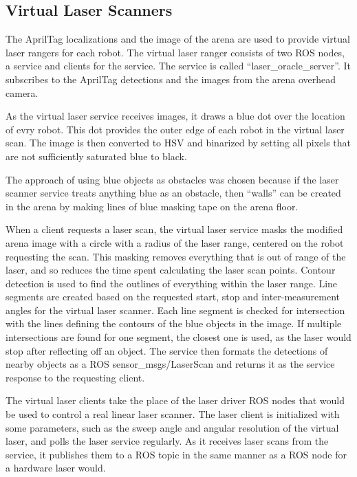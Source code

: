 \documentclass[]{article}
\begin{document}
\subsection{Virtual Laser Scanners}

The AprilTag localizations and the image of the arena are used to provide virtual laser rangers for each robot. 
The virtual laser ranger consists of two ROS nodes, a service and clients for the service. 
The service is called ``laser\_oracle\_server''. 
It subscribes to the AprilTag detections and the images from the arena overhead camera. 

As the virtual laser service receives images, it draws a blue dot over the location of evry robot. 
This dot provides the outer edge of each robot in the virtual laser scan. 
The image is then converted to HSV and binarized by setting all pixels that are not sufficiently saturated blue to black. 

The approach of using blue objects as obstacles was chosen because if the laser scanner service treats anything blue as an obstacle, then ``walls'' can be created in the arena by making lines of blue masking tape on the arena floor. 
 
When a client requests a laser scan, the virtual laser service masks the modified arena image with a circle with a radius of the laser range, centered on the robot requesting the scan.
This masking removes everything that is out of range of the laser, and so reduces the time spent calculating the laser scan points. 
Contour detection is used to find the outlines of everything within the laser range. 
Line segments are created based on the requested start, stop and inter-measurement angles for the virtual laser scanner. 
Each line segment is checked for intersection with the lines defining the contours of the blue objects in the image. 
If multiple intersections are found for one segment, the closest one is used, as the laser would stop after reflecting off an object.
The service then formats the detections of nearby objects as a ROS sensor\_msgs/LaserScan and returns it as the service response to the requesting client. 

The virtual laser clients take the place of the laser driver ROS nodes that would be used to control a real linear laser scanner. 
The laser client is initialized with some parameters, such as the sweep angle and angular resolution of the virtual laser, and polls the laser service regularly. 
As it receives laser scans from the service, it publishes them to a ROS topic in the same manner as a ROS node for a hardware laser would. 
\end{document}
